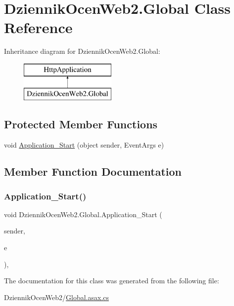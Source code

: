 \hypertarget{class_dziennik_ocen_web2_1_1_global}{}\section{Dziennik\+Ocen\+Web2.\+Global Class Reference}
\label{class_dziennik_ocen_web2_1_1_global}
Inheritance diagram for Dziennik\+Ocen\+Web2.\+Global\+:\begin{figure}[H]
\begin{center}
\leavevmode
\includegraphics[height=2.000000cm]{class_dziennik_ocen_web2_1_1_global}
\end{center}
\end{figure}
\subsection*{Protected Member Functions}
\begin{DoxyCompactItemize}
\item 
void \hyperlink{class_dziennik_ocen_web2_1_1_global_a8c54a9bf2279bed6da81321977d82574}{Application\+\_\+\+Start} (object sender, Event\+Args e)
\end{DoxyCompactItemize}


\subsection{Member Function Documentation}
\mbox{\label{class_dziennik_ocen_web2_1_1_global_a8c54a9bf2279bed6da81321977d82574}} 
\subsubsection{\texorpdfstring{Application\+\_\+\+Start()}{Application\_Start()}}
{\footnotesize\ttfamily void Dziennik\+Ocen\+Web2.\+Global.\+Application\+\_\+\+Start (\begin{DoxyParamCaption}\item[{object}]{sender,  }\item[{Event\+Args}]{e }\end{DoxyParamCaption})\hspace{0.3cm}{\ttfamily [inline]}, {\ttfamily [protected]}}



The documentation for this class was generated from the following file\+:\begin{DoxyCompactItemize}
\item 
Dziennik\+Ocen\+Web2/\hyperlink{_global_8asax_8cs}{Global.\+asax.\+cs}\end{DoxyCompactItemize}
